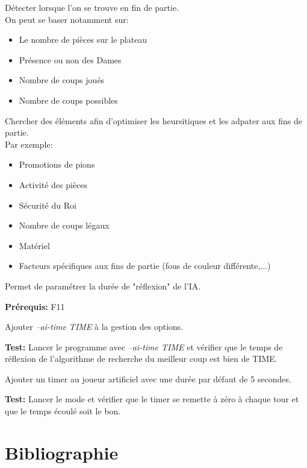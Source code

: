 \documentclass{article}
\begin{document}
\begin{needbox}
    \begin{subneedbox}
        Détecter lorsque l'on se trouve en fin de partie.\\
        On peut se baser notamment sur:
        \begin{itemize}
            \item Le nombre de pièces sur le plateau
            \item Présence ou non des Dames 
            \item Nombre de coups joués 
            \item Nombre de coups possibles
        \end{itemize}
    \end{subneedbox}
    \begin{subneedbox}
        Chercher des éléments afin d'optimiser les heursitiques et les adpater aux fins de partie.\\
        Par exemple:
        \begin{itemize}
            \item Promotions de pions
            \item Activité des pièces
            \item Sécurité du Roi
            \item Nombre de coups légaux
            \item Matériel
            \item Facteurs spécifiques aux fins de partie (fous de couleur différente,...)
        \end{itemize}
    \end{subneedbox}
\end{needbox}

\begin{needbox}
    Permet de paramétrer la durée de "réflexion" de l'IA.

    \textbf{Prérequis:} F11
    \begin{subneedbox}
        Ajouter \textit{--ai-time TIME} à la gestion des options.

        \textbf{Test:} Lancer le programme avec \textit{--ai-time TIME} et vérifier que
        le temps de réflexion de l'algorithme de recherche du meilleur coup est bien de TIME.
    \end{subneedbox}
    \begin{subneedbox}
        Ajouter un timer au joueur artificiel avec une durée par défaut de 5 secondes.

        \textbf{Test:} Lancer le mode et vérifier que le timer se remette à zéro à chaque tour et que le temps écoulé soit le bon.
    \end{subneedbox}
\end{needbox}


\pagebreak
\section{Bibliographie}


\end{document}
